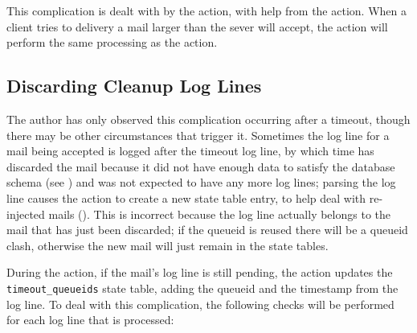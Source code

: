 This complication is dealt with by the  action, with help
from the  action.  When a client tries to delivery a mail
larger than the sever will accept, the  action
will perform the same processing as the  action.

\subsection{Discarding Cleanup Log Lines}

\label{discarding cleanup log lines}

The author has only observed this complication occurring after a timeout,
though there may be other circumstances that trigger it.  Sometimes the
 log line for a mail being accepted is logged after the
timeout log line, by which time \parsername{} has discarded the mail
because it did not have enough data to satisfy the database schema (see
) and was not expected to have any
more log lines; parsing the  log line causes the
 action to create a new state table entry, to
help deal with re-injected mails ().  This is
incorrect because the log line actually belongs to the mail that has just
been discarded; if the queueid is reused there will be a queueid clash,
otherwise the new mail will just remain in the state tables.

During the  action, if the mail's  log line
is still pending, the  action updates the
\texttt{timeout\_queueids} state table, adding the queueid and the
timestamp from the log line.  To deal with this complication, the following
checks will be performed for each  log line that is
processed:

